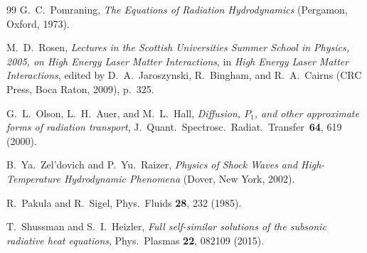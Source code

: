 \documentclass[prl, twocolumn, superscriptaddress, amsmath, amssymb, reprint]{revtex4-2}
\begin{document}
\begin{thebibliography}{99}
G.~C.~Pomraning,
\textit{The Equations of Radiation Hydrodynamics}
(Pergamon, Oxford, 1973).

M.~D.~Rosen,
\textit{Lectures in the Scottish Universities Summer School in Physics, 2005, on High Energy Laser Matter Interactions},
in \textit{High Energy Laser Matter Interactions}, edited by D.~A.~Jaroszynski, R.~Bingham, and R.~A.~Cairns
(CRC Press, Boca Raton, 2009), p.~325.

G.~L.~Olson, L.~H.~Auer, and M.~L.~Hall,
\textit{Diffusion, $P_1$, and other approximate forms of radiation transport},
J.~Quant.~Spectrosc.~Radiat.~Transfer~\textbf{64}, 619 (2000).

B.~Ya.~Zel'dovich and P.~Yu.~Raizer,
\textit{Physics of Shock Waves and High-Temperature Hydrodynamic Phenomena}
(Dover, New York, 2002).

R.~Pakula and R.~Sigel,
Phys.\ Fluids \textbf{28}, 232 (1985).



T.~Shussman and S.~I.~Heizler,
\textit{Full self-similar solutions of the subsonic radiative heat equations},
Phys.\ Plasmas \textbf{22}, 082109 (2015).

\end{thebibliography}
\end{document}
